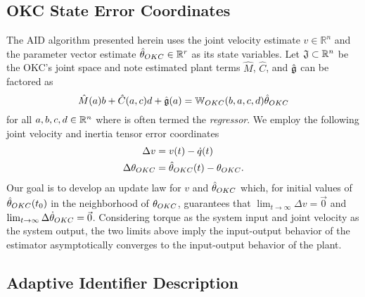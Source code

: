 \subsection{\acs{OKC} State Error Coordinates}

The \ac{AID} algorithm presented herein uses the joint velocity
estimate $v\in \mathbb{R}^{n}$ and the parameter vector estimate
$\hat{\theta}_{OKC}\in\mathbb{R}^{r}$ as its state variables. Let
$\mathfrak{J}\subset\mathbb{R}^{n}$ be the \ac{OKC}'s joint space and note
estimated plant terms $\hat{M}$, $\hat{C}$, and $\hat{\mathfrak{g}}$ can be
factored as
%
\begin{equation}
\hat{M}(a)b+\hat{C}(a,c)d+\hat{\mathfrak{g}}(a)=\mathbb{W}_{OKC}(b,a,c,d)\hat{\theta}_{OKC}
\end{equation}
%
for all $a,b,c,d\in\mathbb{R}^{n}$ where
 is often termed the {\it regressor}.
%
We employ the following joint velocity and inertia tensor
error coordinates
%
\begin{align}
\Delta v&=v(t)-\dot{q}(t)           \label{chSMS_ID.eq.OKC_AID_deltaVel} \\
\Delta \theta_{OKC}&=\hat{\theta}_{OKC}(t) - \theta_{OKC}.    \label{chSMS_ID.eq.OKC_AID_deltaPar} 
\end{align}
%
%
Our goal is to develop an update law for $v$ and
$\hat{\theta}_{OKC}$ which, for initial values of $\hat{\theta}_{OKC}(t_0)$ in the
neighborhood of $\theta_{OKC}$, guarantees that $\lim_{t\to
  \infty}\Delta v=\vec{0}$ and $\lim_{t\to \infty}\Delta
\dot{\theta}_{OKC}=\vec{0}$. Considering torque as the system input and
joint velocity as the system output, the two limits above imply the
input-output behavior of the estimator asymptotically converges to the
input-output behavior of the plant.


\subsection{Adaptive Identifier Description}




